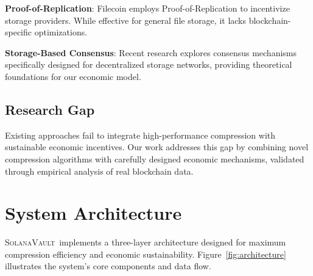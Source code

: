 \documentclass[11pt,a4paper]{article}
\newcommand{\SolanaVault}{\textsc{SolanaVault}}
\begin{document}
\textbf{Proof-of-Replication}: Filecoin employs Proof-of-Replication to incentivize storage providers\cite{filecoin_proof_rep}. While effective for general file storage, it lacks blockchain-specific optimizations.

\textbf{Storage-Based Consensus}: Recent research explores consensus mechanisms specifically designed for decentralized storage networks\cite{storage_consensus_2024}, providing theoretical foundations for our economic model.

\subsection{Research Gap}

Existing approaches fail to integrate high-performance compression with sustainable economic incentives. Our work addresses this gap by combining novel compression algorithms with carefully designed economic mechanisms, validated through empirical analysis of real blockchain data.

\section{System Architecture}
\label{sec:architecture}

\SolanaVault\ implements a three-layer architecture designed for maximum compression efficiency and economic sustainability. Figure~\ref{fig:architecture} illustrates the system's core components and data flow.
\end{document}

